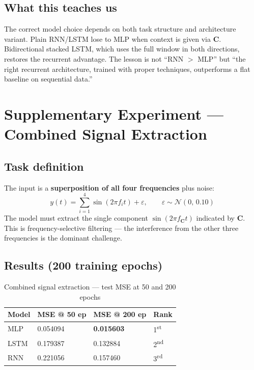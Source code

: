 \documentclass[12pt, a4paper]{article}
\begin{document}
\subsection{What this teaches us}

The correct model choice depends on both task structure and architecture
variant. Plain RNN/LSTM lose to MLP when context is given via $\mathbf{C}$.
Bidirectional stacked LSTM, which uses the full window in both directions,
restores the recurrent advantage. The lesson is not ``RNN $>$ MLP'' but
``the right recurrent architecture, trained with proper techniques,
outperforms a flat baseline on sequential data.''

\section{Supplementary Experiment — Combined Signal Extraction}
\label{sec:combined}

\subsection{Task definition}

The input is a \textbf{superposition of all four frequencies} plus noise:
\begin{equation}
    y(t) = \sum_{i=1}^{4}\sin(2\pi f_i t) + \varepsilon,
    \qquad \varepsilon \sim \mathcal{N}(0,\,0.10)
\end{equation}
The model must extract the single component $\sin(2\pi f_{\mathbf{C}} t)$
indicated by $\mathbf{C}$. This is frequency-selective filtering — the
interference from the other three frequencies is the dominant challenge.

\subsection{Results (200 training epochs)}

\begin{table}[H]
\centering
\caption{Combined signal extraction — test MSE at 50 and 200 epochs}
\label{tab:combined}
\begin{tabular}{llll}
\toprule
\textbf{Model} & \textbf{MSE @ 50 ep} & \textbf{MSE @ 200 ep} & \textbf{Rank} \\
\midrule
MLP  & 0.054094 & \textbf{0.015603} & 1\textsuperscript{st} \\
LSTM & 0.179387 & 0.132884          & 2\textsuperscript{nd} \\
RNN  & 0.221056 & 0.157460          & 3\textsuperscript{rd} \\
\bottomrule
\end{tabular}
\end{table}
\end{document}
